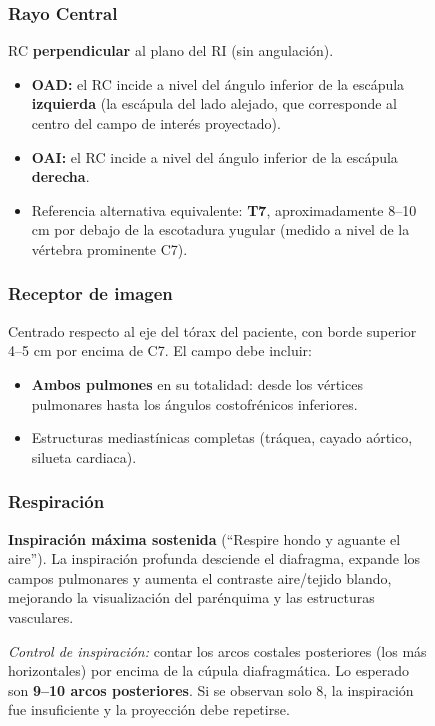 \begin{figure}
{\subsubsection*{Rayo Central}

RC \textbf{perpendicular} al plano del RI (sin angulación).

\begin{itemize}
  \item \textbf{OAD:} el RC incide a nivel del ángulo inferior de la escápula \textbf{izquierda}
        (la escápula del lado alejado, que corresponde al centro del campo de interés proyectado).
  \item \textbf{OAI:} el RC incide a nivel del ángulo inferior de la escápula \textbf{derecha}.
  \item Referencia alternativa equivalente: \textbf{T7}, aproximadamente 8--10 cm por debajo
        de la escotadura yugular (medido a nivel de la vértebra prominente C7).
\end{itemize}

\subsubsection*{Receptor de imagen}

Centrado respecto al eje del tórax del paciente, con borde superior 4--5 cm por encima de C7.
El campo debe incluir:

\begin{itemize}
  \item \textbf{Ambos pulmones} en su totalidad: desde los vértices pulmonares hasta los ángulos
        costofrénicos inferiores.
  \item Estructuras mediastínicas completas (tráquea, cayado aórtico, silueta cardiaca).
\end{itemize}

\subsubsection*{Respiración}

\textbf{Inspiración máxima sostenida} (``Respire hondo y aguante el aire''). La inspiración profunda
desciende el diafragma, expande los campos pulmonares y aumenta el contraste aire/tejido blando,
mejorando la visualización del parénquima y las estructuras vasculares.

\textit{Control de inspiración:} contar los arcos costales posteriores (los más horizontales)
por encima de la cúpula diafragmática. Lo esperado son \textbf{9--10 arcos posteriores}. Si se
observan solo 8, la inspiración fue insuficiente y la proyección debe repetirse.

}
\end{figure}
